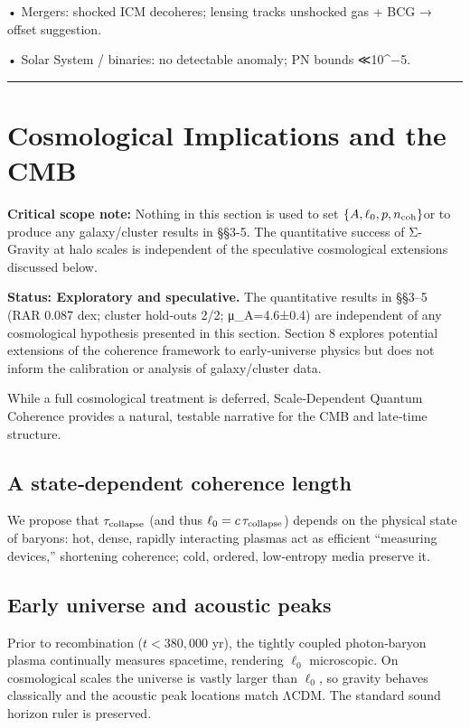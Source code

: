 \documentclass[11pt,a4paper]{article}
\begin{document}
• Mergers: shocked ICM decoheres; lensing tracks unshocked gas + BCG → offset suggestion.  

• Solar System / binaries: no detectable anomaly; PN bounds ≪10^−5.


\medskip\hrule\medskip


\section{Cosmological Implications and the CMB}


\textbf{Critical scope note:} Nothing in this section is used to set $\allowbreak \{A, \ell_0, p, n_{\rm coh}\}$\allowbreak  or to produce any galaxy/cluster results in §§3-5. The quantitative success of Σ-Gravity at halo scales is independent of the speculative cosmological extensions discussed below.


\textbf{Status: Exploratory and speculative.} The quantitative results in §§3–5 (RAR 0.087 dex; cluster hold-outs 2/2; μ\_A=4.6±0.4) are independent of any cosmological hypothesis presented in this section. Section 8 explores potential extensions of the coherence framework to early‑universe physics but does not inform the calibration or analysis of galaxy/cluster data.


While a full cosmological treatment is deferred, Scale‑Dependent Quantum Coherence provides a natural, testable narrative for the CMB and late‑time structure.


\subsection{A state‑dependent coherence length}


We propose that $\tau_{\rm collapse}$ (and thus $\allowbreak \ell_0=c\,\tau_{\rm collapse}$\allowbreak ) depends on the physical state of baryons: hot, dense, rapidly interacting plasmas act as efficient “measuring devices,” shortening coherence; cold, ordered, low‑entropy media preserve it.


\subsection{Early universe and acoustic peaks}


Prior to recombination ($t<380{,}000$ yr), the tightly coupled photon‑baryon plasma continually measures spacetime, rendering $\ell_0$ microscopic. On cosmological scales the universe is vastly larger than $\ell_0$, so gravity behaves classically and the acoustic peak locations match ΛCDM. The standard sound horizon ruler is preserved.
\end{document}
